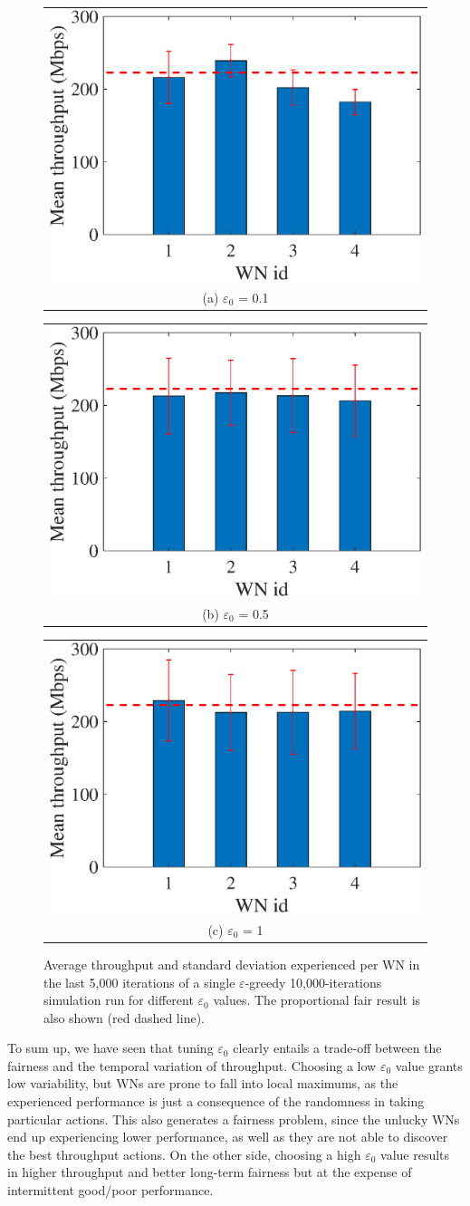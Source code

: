 \documentclass[preprint,12pt]{elsarticle}
\begin{document}
\begin{figure}
	\centering
	\begin{tabular}{@{}c@{}}
		\includegraphics[width=.3\textwidth]{images/NEW_mean_tpt_e-greedy_e01} \\[\abovecaptionskip]
		\small (a) $\varepsilon_0$ = 0.1
		\label{fig:eg_e01_avg_tpt}
	\end{tabular}	
	\hspace{\floatsep}	
	\begin{tabular}{@{}c@{}}
		\includegraphics[width=.3\textwidth]{images/NEW_mean_tpt_e-greedy_e05} \\[\abovecaptionskip]
		\small (b) $\varepsilon_0$ = 0.5
		\label{fig:eg_e05_avg_tpt}
	\end{tabular}
	\hspace{\floatsep}
	\begin{tabular}{@{}c@{}}
		\includegraphics[width=.3\textwidth]{images/NEW_mean_tpt_e-greedy_e1} \\[\abovecaptionskip]
		\small (c) $\varepsilon_0$ = 1
		\label{fig:eg_e1_avg_tpt}
	\end{tabular}
	\caption{Average throughput and standard deviation experienced per WN in the last 5,000 iterations of a single $\varepsilon$-greedy 10,000-iterations simulation run for different $\varepsilon_0$ values. The proportional fair result is also shown (red dashed line).}
	\label{fig:eg_avg_tpt}
\end{figure}

To sum up, we have seen that tuning $\varepsilon_0$ clearly entails a trade-off between the fairness and the temporal variation of throughput. Choosing a low $\varepsilon_0$ value grants low variability, but WNs are prone to fall into local maximums, as the experienced performance is just a consequence of the randomness in taking particular actions. This also generates a fairness problem, since the unlucky WNs end up experiencing lower performance, as well as they are not able to discover the best throughput actions. On the other side, choosing a high $\varepsilon_0$ value results in higher throughput and better long-term fairness but at the expense of intermittent good/poor performance.
\end{document}
